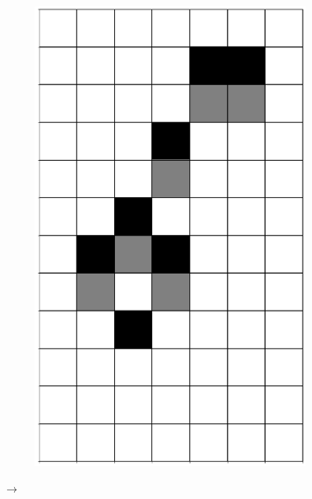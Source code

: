\documentclass[12pt]{article}
\numberwithin{figure}{section} %
\begin{document}
\begin{figure}[H]
\begin{subfigure}{0.3\textwidth}
     \includegraphics[angle=270,width=\linewidth]{Section4/10.2}
     \subcaption{}
   \end{subfigure}
      {\LARGE$\xrightarrow{}$}
      \newline
   \setcounter{subfigure}{0}
   \begin{subfigure}{0.3\textwidth}
     \centering

\end{subfigure}
\end{figure}
\end{document}
